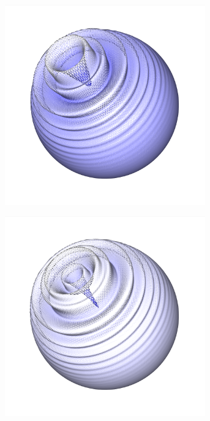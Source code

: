 \documentclass[crop=false]{standalone}
\begin{document}
\begin{figure}
      \begin{subfigure}[b]{0.24\textwidth}
        \center
        \includegraphics[trim={2.12cm 2.33cm 2.2cm 0cm},clip,width=0.95\textwidth]{images/sphere_wave_4.png}
        \caption{}
      \end{subfigure}
      \begin{subfigure}[b]{0.24\textwidth}
        \center
        \includegraphics[trim={2.12cm 2.33cm 2.2cm 0cm},clip,width=0.95\textwidth]{images/sphere_wave_5.png}

\end{subfigure}
\end{figure}
\end{document}
